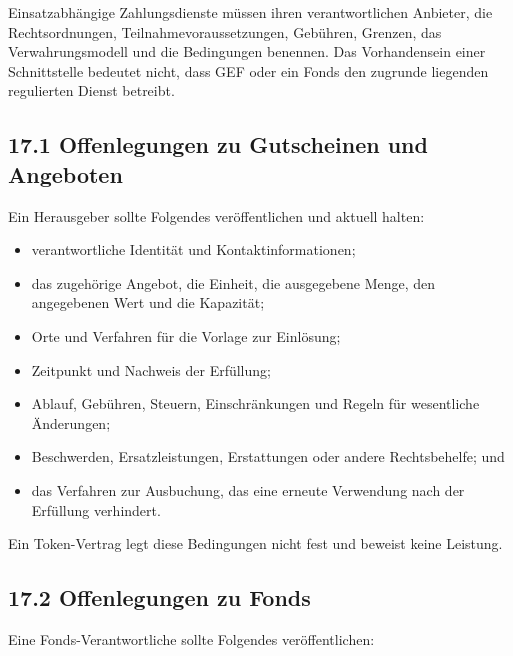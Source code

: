 \documentclass[11pt]{article}
\begin{document}
Einsatzabhängige Zahlungsdienste müssen ihren verantwortlichen Anbieter, die Rechtsordnungen, Teilnahmevoraussetzungen, Gebühren, Grenzen, das Verwahrungsmodell und die Bedingungen benennen. Das Vorhandensein einer Schnittstelle bedeutet nicht, dass GEF oder ein Fonds den zugrunde liegenden regulierten Dienst betreibt.

\subsection*{17.1 Offenlegungen zu Gutscheinen und Angeboten}

Ein Herausgeber sollte Folgendes veröffentlichen und aktuell halten:

\begin{itemize}[leftmargin=*]
\item verantwortliche Identität und Kontaktinformationen;
\item das zugehörige Angebot, die Einheit, die ausgegebene Menge, den angegebenen Wert und die Kapazität;
\item Orte und Verfahren für die Vorlage zur Einlösung;
\item Zeitpunkt und Nachweis der Erfüllung;
\item Ablauf, Gebühren, Steuern, Einschränkungen und Regeln für wesentliche Änderungen;
\item Beschwerden, Ersatzleistungen, Erstattungen oder andere Rechtsbehelfe; und
\item das Verfahren zur Ausbuchung, das eine erneute Verwendung nach der Erfüllung verhindert.
\end{itemize}
Ein Token-Vertrag legt diese Bedingungen nicht fest und beweist keine Leistung.

\subsection*{17.2 Offenlegungen zu Fonds}

Eine Fonds-Verantwortliche sollte Folgendes veröffentlichen:
\end{document}

